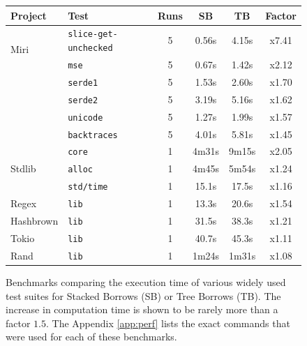 \documentclass[a4paper,11pt]{article}
\theoremstyle{plain}
\theoremstyle{definition}
\theoremstyle{remark}
\begin{document}
\begin{figure}
    \centering
    \begin{tabular}{|l|l|c|c|c|c|}
        \hline
        Project & Test & Runs & SB & TB & Factor \\
        \hline
        \multirow{2}{9em}{Miri}
            & \texttt{slice-get-unchecked} & 5 & 0.56s & 4.15s & {\color{Red}x7.41} \\
            & \texttt{mse} & 5 & 0.67s & 1.42s & {\color{Red}x2.12} \\
            & \texttt{serde1} & 5 & 1.53s & 2.60s & {\color{YellowOrange}x1.70} \\
            & \texttt{serde2} & 5 & 3.19s & 5.16s & {\color{YellowOrange}x1.62} \\
            & \texttt{unicode} & 5 & 1.27s & 1.99s & {\color{YellowOrange}x1.57} \\
            & \texttt{backtraces} & 5 & 4.01s & 5.81s & {\color{YellowOrange}x1.45} \\
        \hline
        \multirow{3}{9em}{Stdlib}
            & \texttt{core} & 1 & 4m31s & 9m15s & {\color{Red}x2.05} \\
            & \texttt{alloc} & 1 & 4m45s & 5m54s & {\color{LimeGreen}x1.24} \\
            & \texttt{std/time} & 1 & 15.1s & 17.5s & {\color{LimeGreen}x1.16} \\
        \hline
        \multirow{1}{9em}{Regex}
            & \texttt{lib} & 1 & 13.3s & 20.6s & {\color{YellowOrange}x1.54} \\
        \multirow{1}{9em}{Hashbrown}
            & \texttt{lib} & 1 & 31.5s & 38.3s & {\color{LimeGreen}x1.21} \\
        \multirow{1}{9em}{Tokio}
            & \texttt{lib} & 1 & 40.7s & 45.3s & {\color{LimeGreen}x1.11} \\
        \multirow{1}{9em}{Rand}
            & \texttt{lib} & 1 & 1m24s & 1m31s & {\color{LimeGreen}x1.08} \\
        \hline
    \end{tabular}
    \caption{
        Benchmarks comparing the execution time of various widely used test suites
        for Stacked Borrows (SB) or Tree Borrows (TB). The increase in computation time
        is shown to be rarely more than a factor \(1.5\).
        The Appendix \ref{app:perf} lists the exact commands that were used for each of these
        benchmarks.
    }
    \label{fig:perf}
\end{figure}
\end{document}
